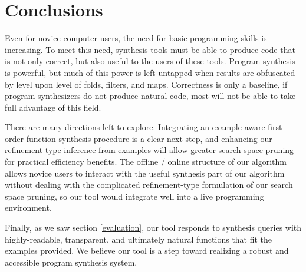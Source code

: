 \section{Conclusions}
\label{conclusions}
Even for novice computer users, the need for basic programming skills is increasing. To meet this need, synthesis tools must be able to produce code that is not only correct, but also useful to the users of these tools. Program synthesis is powerful, but much of this power is left untapped when results are obfuscated by level upon level of folds, filters, and maps. Correctness is only a baseline, if program synthesizers do not produce natural code, most will not be able to take full advantage of this field.

There are many directions left to explore. Integrating an example-aware first-order function synthesis procedure is a clear next step, and enhancing our refinement type inference from examples will allow greater search space pruning for practical efficiency benefits. The offline / online structure of our algorithm allows novice users to interact with the useful synthesis part of our algorithm without dealing with the complicated refinement-type formulation of our search space pruning, so our tool would integrate well into a live programming environment.

Finally, as we saw section \ref{evaluation}, our tool responds to synthesis queries with highly-readable, transparent, and ultimately natural functions that fit the examples provided. We believe our tool is a step toward realizing a robust and accessible program synthesis system.
